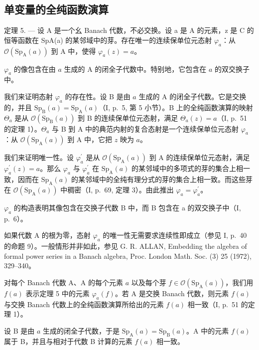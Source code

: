\subsection{单变量的全纯函数演算}

定理 5. --- 设 A 是一个幺 Banach 代数，不必交换。设 a 是 A 的元素，z 是 C 的恒等函数在 SpA(a) 的某邻域中的芽。存在唯一的连续保单位元态射 \(\varphi_{a}\)：从 \(\mathcal{O}(\mathrm{Sp}_{\mathrm{A}}(a))\) 到 A 中，使得 \(\varphi_{a}(z)=a\)。

\(\varphi_{a}\) 的像包含在由 \(a\) 生成的 A 的闭全子代数中。特别地，它包含在 \(a\) 的双交换子中。

我们来证明态射 \(\varphi_{a}\) 的存在性。设 B 是由 \(a\) 生成的 A 的闭全子代数。它是交换的，并且 \(\mathrm{Sp}_{\mathrm{B}}(a) = \mathrm{Sp}_{\mathrm{A}}(a)\)（I, p.~5, 第 5 小节）。B 上的全纯函数演算的映射 \(\Theta_{a}\) 是从 \(\mathcal{O}(\mathrm{Sp}_{\mathrm{B}}(a))\) 到 B 的连续保单位元态射，满足 \(\Theta_{a}(z) = a\)（I, p.~51 的定理 1）。\(\Theta_{a}\) 与 B 到 A 中的典范内射的复合态射是一个连续保单位元态射 \(\varphi_{a}\)：从 \(\mathcal{O}(\mathrm{Sp}_{\mathrm{A}}(a))\) 到 A 中，它把 \(z\) 映为 \(a\)。

我们来证明唯一性。设 \(\varphi_{a}^{\prime}\) 是从 \(\mathcal{O}(\mathrm{Sp}_{\mathrm{A}}(a))\) 到 A 的连续保单位元态射，满足 \(\varphi_{a}^{\prime}(z)=a\)。那么 \(\varphi_{a}\) 与 \(\varphi_{a}^{\prime}\) 在 \(\mathrm{Sp}_{\mathrm{A}}(a)\) 的某邻域中的多项式的芽的集合上相一致，因而在 \(\mathrm{Sp}_{\mathrm{A}}(a)\) 的某邻域中的全纯有理分式的芽的集合上相一致。而这些芽在 \(\mathcal{O}(\mathrm{Sp}_{\mathrm{A}}(a))\) 中稠密（I, p.~69, 定理 3）。由此推出 \(\varphi_{a}=\varphi_{a}^{\prime}\)。

\(\varphi_{a}\) 的构造表明其像包含在交换子代数 B 中，而 B 包含在 a 的双交换子中（I, p.~6）。

如果代数 A 的根为零，态射 \(\varphi_{a}\) 的唯一性无需要求连续性即成立（参见 I, p.~40 的命题 9）。一般情形并非如此，参见 G. R. ALLAN, Embedding the algebra of formal power series in a Banach algebra, Proc. London Math. Soc. (3) 25 (1972), 329--340。

对每个 Banach 代数 A、A 的每个元素 \(a\) 以及每个芽 \(f \in \mathcal{O}(\mathrm{Sp}_{\mathrm{A}}(a))\)，我们用 \(f(a)\) 表示定理 5 中的元素 \(\varphi_{a}(f)\)。若 A 是交换 Banach 代数，则元素 \(f(a)\) 与交换 Banach 代数上的全纯函数演算所给出的元素 \(f(a)\) 相一致（I, p.~51 的定理 1）。

设 B 是由 \(a\) 生成的闭全子代数，于是 \(\mathrm{Sp}_{\mathrm{A}}(a) = \mathrm{Sp}_{\mathrm{B}}(a)\)。A 中的元素 \(f(a)\) 属于 B，并且与相对于代数 B 计算的元素 \(f(a)\) 相一致。

